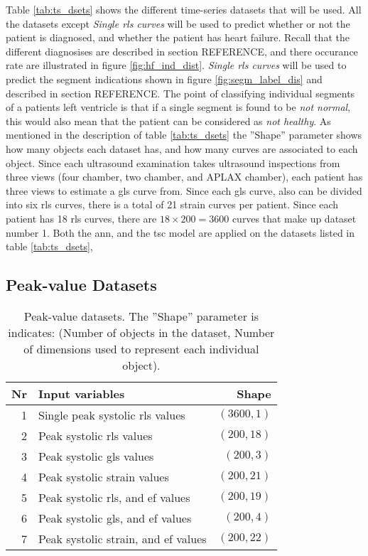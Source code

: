 Table \ref{tab:ts_dsets} shows the different time-series datasets that will be used. 
All the datasets except \textit{Single \acrshort{rls} curves} will be used to predict whether or not the patient is diagnosed, and whether the patient has heart failure.
Recall that the different diagnosises are described in section REFERENCE, and there occurance rate are illustrated in figure \ref{fig:hf_ind_dist}.
\textit{Single \acrshort{rls} curves} will be used to predict the segment indications shown in figure \ref{fig:segm_label_dis} and described in section REFERENCE. 
The point of classifying individual segments of a patients left ventricle is that if a single segment is found to be \textit{not normal}, 
this would also mean that the patient can be considered as \textit{not healthy}.
As mentioned in the description of table \ref{tab:ts_dsets} the ''Shape'' parameter shows how many objects each dataset has, and how many curves are associated to each object. 
Since each ultrasound examination takes ultrasound inspections from three views (four chamber, two chamber, and APLAX chamber), each patient has three views to estimate a \acrshort{gls} curve from. 
Since each \acrshort{gls} curve, also can be divided into six \acrshort{rls} curves, there is a total of 21 strain curves per patient. 
Since each patient has 18 \acrshort{rls} curves, there are $18 \times 200 = 3600$ curves that make up dataset number 1.
Both the \acrshort{ann}, and the \acrshort{tsc} model are applied on the datasets listed in table \ref{tab:ts_dsets}, 
\bigskip

\subsection{Peak-value Datasets}

\begin{table*}[h]
    \centering
    \begin{tabular}{ rlr }
        \toprule
        Nr & Input variables                     & Shape \\
        \midrule                              
        1  & Single peak systolic \acrshort{rls} values                & $(3600,1)$ \\
        2  & Peak systolic \acrshort{rls} values                       & $(200,18)$ \\
        3  & Peak systolic \acrshort{gls} values                       & $(200,3)$  \\
        4  & Peak systolic strain values                               & $(200,21)$ \\
        5  & Peak systolic \acrshort{rls}, and \acrshort{ef} values    & $(200,19)$ \\
        6  & Peak systolic \acrshort{gls}, and \acrshort{ef} values    & $(200,4)$  \\
        7  & Peak systolic strain, and \acrshort{ef} values            & $(200,22)$ \\
        \bottomrule
    \end{tabular}
    \caption{Peak-value datasets. The ''Shape'' parameter is indicates: (Number of objects in the dataset, Number of dimensions used to represent each individual object).}
    \label{tab:pv_dsets}
\end{table*}

